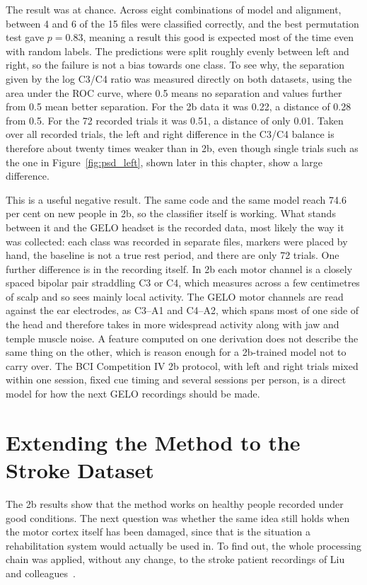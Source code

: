 The result was at chance. Across eight combinations of model and alignment, between 4 and
6 of the 15 files were classified correctly, and the best permutation test gave
$p = 0.83$, meaning a result this good is expected most of the time even with random
labels. The predictions were split roughly evenly between left and right, so the failure
is not a bias towards one class. To see why, the separation given by the log C3/C4 ratio
was measured directly on both datasets, using the area under the ROC curve, where 0.5
means no separation and values further from 0.5 mean better separation. For the 2b data
it was 0.22, a distance of 0.28 from 0.5. For the 72 recorded trials it was 0.51, a
distance of only 0.01. Taken over all recorded trials, the left and right difference in
the C3/C4 balance is therefore about twenty times weaker than in 2b, even though single
trials such as the one in Figure~\ref{fig:psd_left}, shown later in this chapter, show a large difference.

This is a useful negative result. The same code and the same model reach 74.6 per cent on
new people in 2b, so the classifier itself is working. What stands between it and the
GELO headset is the recorded data, most likely the way it was collected: each class was
recorded in separate files, markers were placed by hand, the baseline is not a true rest
period, and there are only 72 trials. One further difference is in the recording itself.
In 2b each motor channel is a closely spaced bipolar pair straddling C3 or C4, which
measures across a few centimetres of scalp and so sees mainly local activity. The GELO
motor channels are read against the ear electrodes, as C3--A1 and C4--A2, which spans most
of one side of the head and therefore takes in more widespread activity along with jaw and
temple muscle noise. A feature computed on one derivation does not describe the same thing
on the other, which is reason enough for a 2b-trained model not to carry over. The BCI Competition IV 2b protocol, with left and
right trials mixed within one session, fixed cue timing and several sessions per person,
is a direct model for how the next GELO recordings should be made.

\FloatBarrier

\section{Extending the Method to the Stroke Dataset}
\label{sec:stroke_repro}

The 2b results show that the method works on healthy people recorded under good
conditions. The next question was whether the same idea still holds when the motor cortex
itself has been damaged, since that is the situation a rehabilitation system would
actually be used in. To find out, the whole processing chain was applied, without any
change, to the stroke patient recordings of Liu and colleagues~\cite{liu2024mi}.

